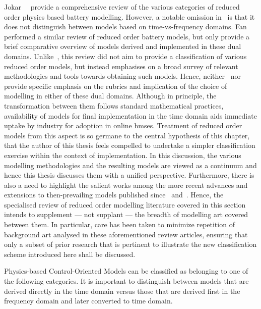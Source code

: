 Jokar~\etal~\cite{Jokar2016} provide a comprehensive review of the various categories of reduced order physics based
battery modelling. However, a notable omission in~\cite{Jokar2016} is that it does not distinguish between models based
on time-vs-frequency domains. Fan~\etal{}~\cite{Fan2015} performed a similar review of reduced order battery models, but
only provide a brief comparative overview of models derived and implemented in these dual domains.
Unlike~\cite{Jokar2016}, this review did not aim to provide a classification of various reduced order models, but
instead emphasises on a broad survey of relevant methodologies and tools towards obtaining such models. Hence,
neither~\cite{Jokar2016} nor~\cite{Fan2015} provide specific emphasis on the rubrics and implication of the choice of
modelling in either of these dual domains. Although in principle, the transformation between them follows standard
mathematical practices,~ availability of models for final implementation in the time domain
aids immediate uptake by industry for adoption in online \gls{bms}es. Treatment of reduced order models from this aspect
is so germane to the central hypothesis of this chapter, that the
author of this thesis feels compelled to undertake a simpler classification exercise within the context of
implementation. In this discussion, the various modelling methodologies and the resulting models are viewed as a
continuum and hence this thesis discusses them with a unified perspective. Furthermore, there is also a need to
highlight the salient works among the more recent advances and extensions to then-prevailing models published
since~\cite{Jokar2016} and~\cite{Fan2015}. Hence, the specialised review of reduced order modelling literature covered
in this section intends to supplement ---  not supplant --- the breadth of modelling art covered between them. In
particular, care has been taken to minimize repetition of background art analysed in these aforementioned review
articles, ensuring that only a subset of prior research that is pertinent to illustrate the new classification scheme
introduced here shall be discussed.

Physics-based Control-Oriented Models can be classified as belonging to one of the following categories. It is important to distinguish between models that are derived directly in the
time domain versus those that are derived first in the frequency domain and later converted to time domain.

